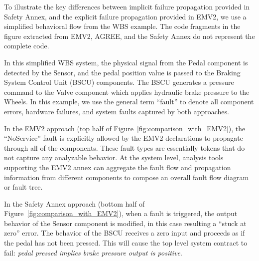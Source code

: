 To illustrate the key differences between implicit failure propagation provided in Safety Annex, and the explicit failure propagation provided in EMV2, we use a simplified behavioral flow from the WBS example. The code fragments in the figure extracted from EMV2, AGREE, and the Safety Annex do not represent the complete code. 

In this simplified WBS system, the physical signal from the Pedal component is detected by the Sensor, and the pedal position value is passed to the Braking System Control Unit (BSCU) components.  The BSCU generates a pressure command to the Valve component which applies hydraulic brake pressure to the Wheels.  In this example, we use the general term ``fault'' to denote all component errors, hardware failures, and system faults captured by both approaches.

In the EMV2 approach (top half of Figure~\ref{fig:comparison_with_EMV2}), the ``NoService'' fault is explicitly allowed by the EMV2 declarations to propagate through all of the components. These fault types are essentially tokens that do not capture any analyzable behavior. At the system level, analysis tools supporting the EMV2 annex can aggregate the fault flow and propagation information from different components to compose an overall fault flow diagram or fault tree. 

In the Safety Annex approach (bottom half of Figure~\ref{fig:comparison_with_EMV2}), when a fault is triggered, the output behavior of the Sensor component is modified, in this case resulting a ``stuck at zero'' error. The behavior of the BSCU receives a zero input and proceeds as if the pedal has not been pressed. This will cause the top level system contract to fail: {\em pedal pressed implies brake pressure output is positive}.

